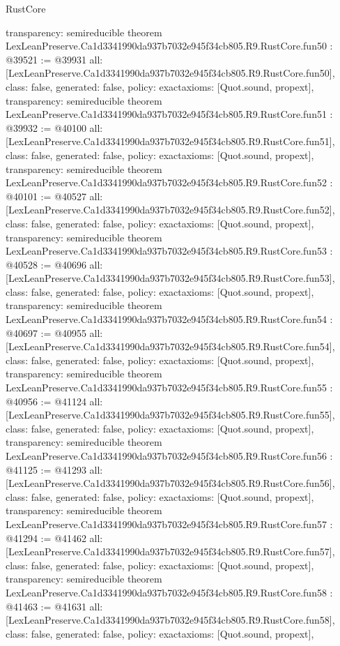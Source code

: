 \begin{lexlean}{RustCore}
\begin{coremodule}
{  transparency: semireducible
}
theorem LexLeanPreserve.Ca1d3341990da937b7032e945f34cb805.R9.RustCore.fun50 : @39521 := @39931 {
  all: [LexLeanPreserve.Ca1d3341990da937b7032e945f34cb805.R9.RustCore.fun50],
  class: false,
  generated: false,
  policy: exact{axioms: [Quot.sound, propext]},
  transparency: semireducible
}
theorem LexLeanPreserve.Ca1d3341990da937b7032e945f34cb805.R9.RustCore.fun51 : @39932 := @40100 {
  all: [LexLeanPreserve.Ca1d3341990da937b7032e945f34cb805.R9.RustCore.fun51],
  class: false,
  generated: false,
  policy: exact{axioms: [Quot.sound, propext]},
  transparency: semireducible
}
theorem LexLeanPreserve.Ca1d3341990da937b7032e945f34cb805.R9.RustCore.fun52 : @40101 := @40527 {
  all: [LexLeanPreserve.Ca1d3341990da937b7032e945f34cb805.R9.RustCore.fun52],
  class: false,
  generated: false,
  policy: exact{axioms: [Quot.sound, propext]},
  transparency: semireducible
}
theorem LexLeanPreserve.Ca1d3341990da937b7032e945f34cb805.R9.RustCore.fun53 : @40528 := @40696 {
  all: [LexLeanPreserve.Ca1d3341990da937b7032e945f34cb805.R9.RustCore.fun53],
  class: false,
  generated: false,
  policy: exact{axioms: [Quot.sound, propext]},
  transparency: semireducible
}
theorem LexLeanPreserve.Ca1d3341990da937b7032e945f34cb805.R9.RustCore.fun54 : @40697 := @40955 {
  all: [LexLeanPreserve.Ca1d3341990da937b7032e945f34cb805.R9.RustCore.fun54],
  class: false,
  generated: false,
  policy: exact{axioms: [Quot.sound, propext]},
  transparency: semireducible
}
theorem LexLeanPreserve.Ca1d3341990da937b7032e945f34cb805.R9.RustCore.fun55 : @40956 := @41124 {
  all: [LexLeanPreserve.Ca1d3341990da937b7032e945f34cb805.R9.RustCore.fun55],
  class: false,
  generated: false,
  policy: exact{axioms: [Quot.sound, propext]},
  transparency: semireducible
}
theorem LexLeanPreserve.Ca1d3341990da937b7032e945f34cb805.R9.RustCore.fun56 : @41125 := @41293 {
  all: [LexLeanPreserve.Ca1d3341990da937b7032e945f34cb805.R9.RustCore.fun56],
  class: false,
  generated: false,
  policy: exact{axioms: [Quot.sound, propext]},
  transparency: semireducible
}
theorem LexLeanPreserve.Ca1d3341990da937b7032e945f34cb805.R9.RustCore.fun57 : @41294 := @41462 {
  all: [LexLeanPreserve.Ca1d3341990da937b7032e945f34cb805.R9.RustCore.fun57],
  class: false,
  generated: false,
  policy: exact{axioms: [Quot.sound, propext]},
  transparency: semireducible
}
theorem LexLeanPreserve.Ca1d3341990da937b7032e945f34cb805.R9.RustCore.fun58 : @41463 := @41631 {
  all: [LexLeanPreserve.Ca1d3341990da937b7032e945f34cb805.R9.RustCore.fun58],
  class: false,
  generated: false,
  policy: exact{axioms: [Quot.sound, propext]},
}
\end{coremodule}
\end{lexlean}
